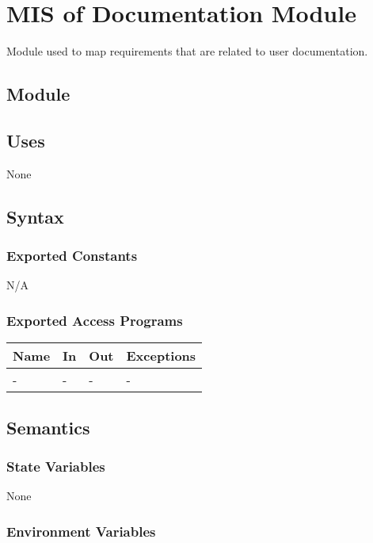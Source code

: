 \documentclass[12pt, titlepage]{article}
\begin{document}
\newpage 

\section{MIS of {Documentation Module}} \label{sec:DocModule} 
Module used to map requirements that are related to user documentation. 
\subsection{Module}

\subsection{Uses}
 None

\subsection{Syntax}

\subsubsection{Exported Constants}
N/A
\subsubsection{Exported Access Programs}

\begin{center}
\begin{tabular}{p{2cm} p{4cm} p{4cm} p{2cm}}
\hline
\textbf{Name} & \textbf{In} & \textbf{Out} & \textbf{Exceptions} \\
\hline
- & - & - & - \\
\hline
\end{tabular}
\end{center}

\subsection{Semantics}

\subsubsection{State Variables}

None

\subsubsection{Environment Variables}
\end{document}
